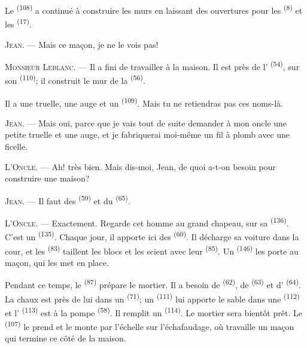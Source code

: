 Le  \textsuperscript{(108)} a continué à construire les murs en
laissant des ouvertures pour les  \textsuperscript{(8)} et les
 \textsuperscript{(17)}.

\textsc{Jean}. --- Mais ce maçon, je ne le vois pas!

\textsc{Monsieur Leblanc}. --- Il a fini de travailler à la maison. Il est près
de l' \textsuperscript{(54)}, sur son 
\textsuperscript{(110)}; il construit le mur de la 
\textsuperscript{(56)}.

Il a une truelle, une auge et un  \textsuperscript{(109)}.
Mais tu ne retiendras pas ces noms-là.

\textsc{Jean}. --- Mais oui, parce que je vais tout de suite demander à mon
oncle une petite truelle et une auge, et je fabriquerai moi-même un fil à plomb
avec une ficelle.

\VUsaut{3.0mm}
\VUsaut{3.0mm}

\textsc{L'Oncle}. --- Ah! très bien. Mais dis-moi, Jean, de quoi a-t-on besoin
pour construire une maison?

\textsc{Jean}. --- Il faut des  \textsuperscript{(59)}
et du  \textsuperscript{(65)}.

\textsc{L'Oncle}. --- Exactement. Regarde cet homme au grand chapeau, sur sa
 \textsuperscript{(136)}. C'est un 
\textsuperscript{(135)}. Chaque jour, il apporte ici des  \textsuperscript{(60)}. Il décharge sa voiture dans la cour, et les
 \textsuperscript{(83)} taillent les blocs et les
scient avec leur  \textsuperscript{(85)}. Un
 \textsuperscript{(146)} les porte au maçon, qui les met en
place.

Pendant ce temps, le  \textsuperscript{(87)} prépare le
mortier. Il a besoin de  \textsuperscript{(62)}, de
 \textsuperscript{(63)} et d' \textsuperscript{(64)}.
La chaux est près de lui dans un  \textsuperscript{(71)}; un
 \textsuperscript{(111)} lui apporte le sable dans une
 \textsuperscript{(112)} et l'
\textsuperscript{(113)} est à la pompe \textsuperscript{(58)}. Il remplit un
 \textsuperscript{(114)}. Le mortier sera bientôt prêt. Le
 \textsuperscript{(107)} le prend et le monte par
l'échelle sur l'échafaudage, où travaille un maçon qui termine ce côté de la
maison.

